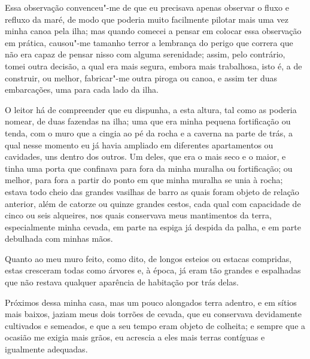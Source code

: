 Essa observação convenceu"-me de que eu precisava apenas observar o fluxo
e refluxo da maré, de modo que poderia muito facilmente pilotar mais uma
vez minha canoa pela ilha; mas quando comecei a pensar em colocar essa
observação em prática, causou"-me tamanho terror a lembrança do perigo
que correra que não era capaz de pensar nisso com alguma serenidade;
assim, pelo contrário, tomei outra decisão, a qual era mais segura,
embora mais trabalhosa, isto é, a de construir, ou melhor, fabricar"-me
outra piroga ou canoa, e assim ter duas embarcações, uma para cada lado
da ilha.

O leitor há de compreender que eu dispunha, a esta altura, tal como as
poderia nomear, de duas fazendas na ilha; uma que era minha pequena
fortificação ou tenda, com o muro que a cingia ao pé da rocha e a
caverna na parte de trás, a qual nesse momento eu já havia ampliado em
diferentes apartamentos ou cavidades, uns dentro dos outros. Um deles,
que era o mais seco e o maior, e tinha uma porta que confinava para fora
da minha muralha ou fortificação; ou melhor, para fora a partir do ponto
em que minha muralha se unia à rocha; estava todo cheio das grandes
vasilhas de barro as quais foram objeto de relação anterior, além de
catorze ou quinze grandes cestos, cada qual com capacidade de cinco ou
seis alqueires, nos quais conservava meus mantimentos da terra,
especialmente minha cevada, em parte na espiga já despida da palha, e em
parte debulhada com minhas mãos.

Quanto ao meu muro feito, como dito, de longos esteios ou estacas
compridas, estas cresceram todas como árvores e, à época, já eram tão
grandes e espalhadas que não restava qualquer aparência de habitação por
trás delas.

Próximos dessa minha casa, mas um pouco alongados terra adentro, e em
sítios mais baixos, jaziam meus dois torrões de cevada, que eu
conservava devidamente cultivados e semeados, e que a seu tempo eram
objeto de colheita; e sempre que a ocasião me exigia mais grãos, eu
acrescia a eles mais terras contíguas e igualmente adequadas.

